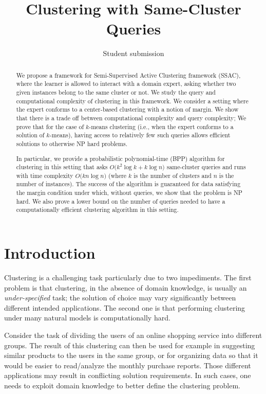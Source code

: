 \documentclass{article}
\title{Clustering with Same-Cluster Queries}
\author{Student submission}
\begin{document}
\maketitle

\begin{abstract}
We propose a framework for Semi-Supervised Active Clustering framework (SSAC), where the learner is allowed to interact with a domain expert, asking whether two given instances belong to the same cluster or not. We study the query and computational complexity of clustering in this framework. We consider a setting where the expert conforms to a center-based clustering with a notion of margin.  We show that there is a trade off between computational complexity and query complexity; We prove that for the case of $k$-means clustering (i.e., when the expert conforms to a solution of $k$-means), having access to relatively few such queries allows efficient solutions to otherwise NP hard problems.

In particular, we provide a probabilistic polynomial-time (BPP) algorithm  for clustering in this setting that asks $O\big(k^2\log k + k\log n)$ same-cluster queries and runs with time complexity $O\big(kn\log n)$ (where $k$ is the number of clusters and $n$ is the number of instances). The success of the algorithm is guaranteed for data satisfying the margin condition under which, without queries, we show that the problem is NP hard. We also prove a lower bound on the number of queries needed to have a computationally efficient clustering algorithm in this setting.
\end{abstract}

\section{Introduction}

Clustering is a challenging task particularly due to two impediments. The first problem is that clustering, in the absence of domain knowledge, is usually an \emph{under-specified} task; the solution of choice may vary significantly between different intended applications. The second one is that performing clustering under many natural models is computationally hard.

Consider the task of dividing the users of an online shopping service into different groups. The result of this clustering can then be used for example in suggesting similar products to the users in the same group, or for organizing data so that it would be easier to read/analyze the monthly purchase reports. Those different applications may result in conflicting solution requirements. In such cases, one needs to exploit domain knowledge to better define the clustering problem.
\end{document}
